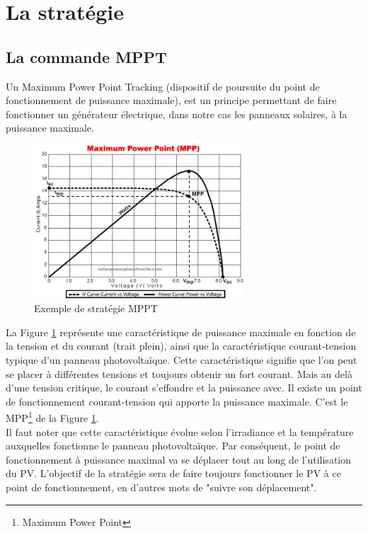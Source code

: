  
\section{La stratégie}

\subsection{La commande MPPT}
Un Maximum Power Point Tracking (dispositif de poursuite du point de fonctionnement de puissance maximale), est un principe permettant de faire fonctionner un générateur électrique, dans notre cas les panneaux solaires, à la puissance maximale.

\begin{figure}[ht]
	\begin{center}
	\includegraphics[width=0.7\textwidth]{images/MPPT.jpeg}
	\caption{Exemple de stratégie MPPT}\label{img:courbe MPPT}
	\end{center}
\end{figure}
\FloatBarrier 

La Figure \ref{img:courbe MPPT} représente une caractéristique de puissance maximale en fonction de la tension et du courant (trait plein), ainsi que la caractéristique courant-tension typique d'un panneau photovoltaïque. Cette caractéristique signifie que l'on peut se placer à différentes tensions et toujours obtenir un fort courant. Mais au delà d'une tension critique, le courant s’effondre et la puissance avec. Il existe un point de fonctionnement courant-tension qui apporte la puissance maximale. C'est le MPP\footnote{Maximum Power Point} de la Figure \ref{img:courbe MPPT}.\\
Il faut noter que cette caractéristique évolue selon l'irradiance et la température auxquelles fonctionne le panneau photovoltaïque. Par conséquent, le point de fonctionnement à puissance maximal va se déplacer tout au long de l'utilisation du PV. L'objectif de la stratégie sera de faire toujours fonctionner le PV à ce point de fonctionnement, en d'autres mots de "suivre son déplacement".\\


